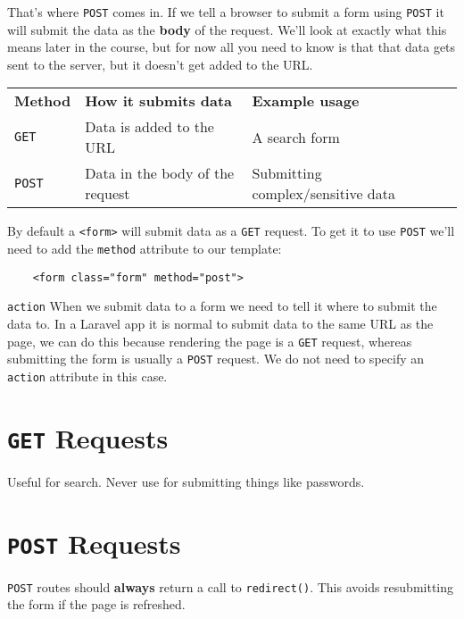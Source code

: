 That's where \texttt{POST} comes in. If we tell a browser to submit a form using \texttt{POST} it will submit the data as the \textbf{body} of the request. We'll look at exactly what this means later in the course, but for now all you need to know is that that data gets sent to the server, but it doesn't get added to the URL.

\begin{tabu}{l l l X}
    \textbf{Method} & \textbf{How it submits data}       & \textbf{Example usage} \\
    \texttt{GET}    & Data is added to the URL           & A search form \\
    \texttt{POST}   & Data in the body of the request    & Submitting complex/sensitive data \\
\end{tabu}

\par\bigskip

By default a \texttt{<form>} will submit data as a \texttt{GET} request. To get it to use \texttt{POST} we'll need to add the \texttt{method} attribute to our template:

\begin{verbatim}
    <form class="form" method="post">
\end{verbatim}


\begin{infobox}{\texttt{action}}
    When we submit data to a form we need to tell it where to submit the data to. In a Laravel app it is normal to submit data to the same URL as the page, we can do this because rendering the page is a \texttt{GET} request, whereas submitting the form is usually a \texttt{POST} request. We do not need to specify an \texttt{action} attribute in this case.
\end{infobox}


\section{\texttt{GET} Requests}

Useful for search. Never use for submitting things like passwords.

\section{\texttt{POST} Requests}

\texttt{POST} routes should \textbf{always} return a call to \texttt{redirect()}. This avoids resubmitting the form if the page is refreshed.

